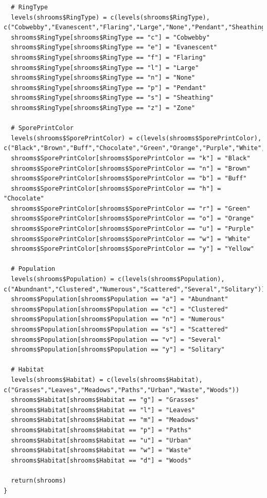 \documentclass[10pt  ,usenames, dvipsnames]{article}\usepackage[]{graphicx}\usepackage[]{color}
\begin{document}
\begin{lstlisting}
  # RingType
  levels(shrooms$RingType) = c(levels(shrooms$RingType), c("Cobwebby","Evanescent","Flaring","Large","None","Pendant","Sheathing","Zone"))
  shrooms$RingType[shrooms$RingType == "c"] = "Cobwebby"
  shrooms$RingType[shrooms$RingType == "e"] = "Evanescent"
  shrooms$RingType[shrooms$RingType == "f"] = "Flaring"
  shrooms$RingType[shrooms$RingType == "l"] = "Large"
  shrooms$RingType[shrooms$RingType == "n"] = "None"
  shrooms$RingType[shrooms$RingType == "p"] = "Pendant"
  shrooms$RingType[shrooms$RingType == "s"] = "Sheathing"
  shrooms$RingType[shrooms$RingType == "z"] = "Zone"
  
  # SporePrintColor
  levels(shrooms$SporePrintColor) = c(levels(shrooms$SporePrintColor), c("Black","Brown","Buff","Chocolate","Green","Orange","Purple","White","Yellow"))
  shrooms$SporePrintColor[shrooms$SporePrintColor == "k"] = "Black"
  shrooms$SporePrintColor[shrooms$SporePrintColor == "n"] = "Brown"
  shrooms$SporePrintColor[shrooms$SporePrintColor == "b"] = "Buff"
  shrooms$SporePrintColor[shrooms$SporePrintColor == "h"] = "Chocolate"
  shrooms$SporePrintColor[shrooms$SporePrintColor == "r"] = "Green"
  shrooms$SporePrintColor[shrooms$SporePrintColor == "o"] = "Orange"
  shrooms$SporePrintColor[shrooms$SporePrintColor == "u"] = "Purple"
  shrooms$SporePrintColor[shrooms$SporePrintColor == "w"] = "White"
  shrooms$SporePrintColor[shrooms$SporePrintColor == "y"] = "Yellow"
  
  # Population
  levels(shrooms$Population) = c(levels(shrooms$Population), c("Abundnant","Clustered","Numerous","Scattered","Several","Solitary"))
  shrooms$Population[shrooms$Population == "a"] = "Abundnant"
  shrooms$Population[shrooms$Population == "c"] = "Clustered"
  shrooms$Population[shrooms$Population == "n"] = "Numerous"
  shrooms$Population[shrooms$Population == "s"] = "Scattered"
  shrooms$Population[shrooms$Population == "v"] = "Several"
  shrooms$Population[shrooms$Population == "y"] = "Solitary"
  
  # Habitat
  levels(shrooms$Habitat) = c(levels(shrooms$Habitat), c("Grasses","Leaves","Meadows","Paths","Urban","Waste","Woods"))
  shrooms$Habitat[shrooms$Habitat == "g"] = "Grasses"
  shrooms$Habitat[shrooms$Habitat == "l"] = "Leaves"
  shrooms$Habitat[shrooms$Habitat == "m"] = "Meadows"
  shrooms$Habitat[shrooms$Habitat == "p"] = "Paths"
  shrooms$Habitat[shrooms$Habitat == "u"] = "Urban"
  shrooms$Habitat[shrooms$Habitat == "w"] = "Waste"
  shrooms$Habitat[shrooms$Habitat == "d"] = "Woods"
  
  return(shrooms)
}
\end{lstlisting}
\end{document}
